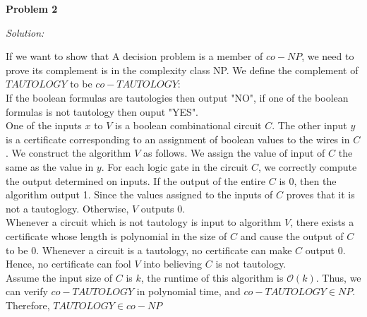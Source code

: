 \documentclass[12pt,letterpaper]{article}
\def\pp{\par\noindent}
\newcommand{\problem}[1]{ \bigskip \pp \textbf{Problem #1}\par}
\newcommand{\solution}{\textit{Solution:}\par}
\begin{document}
\problem{2}
\solution
If we want to show that A decision problem is a member of $co-NP$, we need to prove its complement is in the complexity class NP.
We define the complement of $TAUTOLOGY$ to be $co-TAUTOLOGY$: \\
If the boolean formulas are tautologies then output "NO",
if one of the boolean formulas is not tautology then ouput "YES". \\
One of the inputs $x$ to $V$ is a boolean combinational circuit $C$.
The other input $y$ is a certificate corresponding to an assignment of boolean values to the wires in $C$.
We construct the algorithm $V$ as follows.
We assign the value of input of $C$ the same as the value in $y$.
For each logic gate in the circuit $C$, we correctly compute the output determined on inputs.
If the output of the entire $C$ is 0, then the algorithm output 1.
Since the values assigned to the inputs of $C$ proves that it is not a tautoglogy.
Otherwise, $V$ outputs 0. \\
Whenever a circuit which is not tautology is input to algorithm $V$,
there exists a certificate whose length is polynomial in the size of $C$ and cause the output of $C$ to be 0.
Whenever a circuit is a tautology, no certificate can make $C$ output 0.
Hence, no certificate can fool $V$ into believing $C$ is not tautology. \\
Assume the input size of $C$ is $k$, the runtime of this algorithm is $\mathcal{O}(k)$.
Thus, we can verify $co-TAUTOLOGY$ in polynomial time, and $co-TAUTOLOGY \in NP$. Therefore, $TAUTOLOGY \in co-NP$
\end{document}
